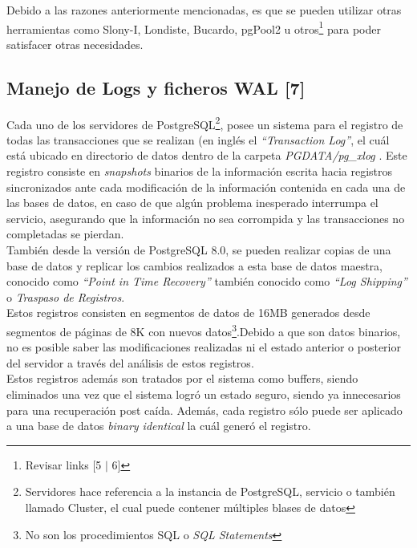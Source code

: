 \documentclass[11pt]{article}
\begin{document}
Debido a las razones anteriormente mencionadas, es que se pueden utilizar otras herramientas como Slony-I, Londiste, Bucardo, pgPool2 u otros\footnote{Revisar links [5 $\vert$ 6]} para poder satisfacer otras necesidades. 

\subsection{Manejo de Logs y ficheros WAL [7] }
Cada uno de los servidores de PostgreSQL\footnote{Servidores hace referencia a la instancia de PostgreSQL, servicio o tambi\'en llamado Cluster, el cual puede contener m\'ultiples blases de datos}, posee un sistema para el registro de todas las transacciones que se realizan (en ingl\'es el \textit{``Transaction Log''}, el cu\'al est\'a ubicado en directorio de datos dentro de la carpeta \textit{PGDATA/pg\_xlog} . Este registro consiste en \textit{snapshots} binarios de la
informaci\'on escrita hacia registros sincronizados ante cada modificaci\'on de la informaci\'on contenida en cada una de las bases de datos, en caso de que alg\'un problema inesperado interrumpa el servicio, asegurando que la informaci\'on no sea corrompida y las transacciones no completadas se pierdan.\\

Tambi\'en desde la versi\'on de PostgreSQL 8.0, se pueden realizar copias de una base de datos y replicar los cambios realizados a esta base de datos maestra, conocido como \textit{``Point in Time Recovery''} tambi\'en conocido como \textit{``Log Shipping''} o \textit{Traspaso de Registros}.\\

Estos registros consisten en segmentos de datos de 16MB generados desde segmentos de p\'aginas de 8K con nuevos datos\footnote{No son los procedimientos SQL o \textit{SQL Statements}}.Debido a que son datos binarios, no es posible saber las modificaciones realizadas ni el estado anterior o posterior del servidor a trav\'es del an\'alisis de estos registros.\\

Estos registros adem\'as son tratados por el sistema como buffers, siendo eliminados una vez que el sistema logr\'o un estado seguro, siendo ya innecesarios para una recuperaci\'on post ca\'ida. Adem\'as, cada registro s\'olo puede ser aplicado a una base de datos \textit{binary identical} la cu\'al gener\'o el registro.\\

\newpage
\end{document}
